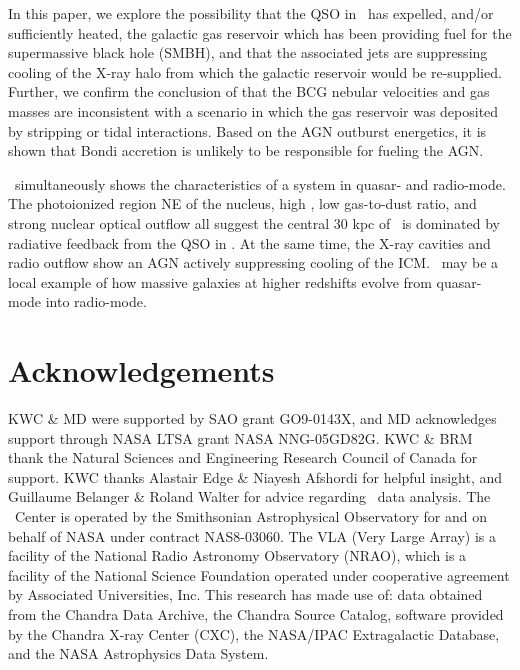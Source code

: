 \documentclass[useAMS,usenatbib]{mn2e}
\begin{document}
In this paper, we explore the possibility that the QSO in \irs\ has
expelled, and/or sufficiently heated, the galactic gas reservoir which
has been providing fuel for the supermassive black hole (SMBH), and
that the associated jets are suppressing cooling of the X-ray halo
from which the galactic reservoir would be re-supplied. Further, we
confirm the conclusion of \citet{1996MNRAS.283.1003C} that the BCG
nebular velocities and gas masses are inconsistent with a scenario in
which the gas reservoir was deposited by stripping or tidal
interactions. Based on the AGN outburst energetics, it is shown that
Bondi accretion is unlikely to be responsible for fueling the AGN.

\irs\ simultaneously shows the characteristics of a system in quasar-
and radio-mode. The photoionized region NE of the nucleus, high \leff,
low gas-to-dust ratio, and strong nuclear optical outflow all suggest
the central 30 kpc of \rxj\ is dominated by radiative feedback from
the QSO in \irs. At the same time, the X-ray cavities and radio
outflow show an AGN actively suppressing cooling of the ICM. \irs\ may
be a local example of how massive galaxies at higher redshifts evolve
from quasar-mode into radio-mode.

\section*{Acknowledgements}

KWC \& MD were supported by SAO grant GO9-0143X, and MD acknowledges
support through NASA LTSA grant NASA NNG-05GD82G. KWC \& BRM thank the
Natural Sciences and Engineering Research Council of Canada for
support. KWC thanks Alastair Edge \& Niayesh Afshordi for helpful
insight, and Guillaume Belanger \& Roland Walter for advice regarding
\integral\ data analysis. The \cxo\ Center is operated by the
Smithsonian Astrophysical Observatory for and on behalf of NASA under
contract NAS8-03060. The VLA (Very Large Array) is a facility of the
National Radio Astronomy Observatory (NRAO), which is a facility of
the National Science Foundation operated under cooperative agreement
by Associated Universities, Inc. This research has made use of: data
obtained from the Chandra Data Archive, the Chandra Source Catalog,
software provided by the Chandra X-ray Center (CXC), the NASA/IPAC
Extragalactic Database, and the NASA Astrophysics Data System.








\label{lastpage}
\end{document}
